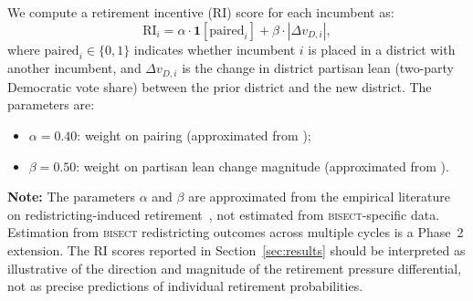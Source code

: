 We compute a retirement incentive (RI) score for each incumbent as:
\[
  \text{RI}_i = \alpha \cdot \mathbf{1}[\text{paired}_i] + \beta \cdot |\Delta v_{D,i}|,
\]
where $\text{paired}_i \in \{0,1\}$ indicates whether incumbent $i$ is placed in a
district with another incumbent, and $\Delta v_{D,i}$ is the change in district
partisan lean (two-party Democratic vote share) between the prior district and the
new district. The parameters are:
\begin{itemize}
  \item $\alpha = 0.40$: weight on pairing (approximated from \citet{ansolabehere2000incumbency});
  \item $\beta = 0.50$: weight on partisan lean change magnitude (approximated from
    \citet{ansolabehere2000incumbency}).
\end{itemize}
\textbf{Note:} The parameters $\alpha$ and $\beta$ are approximated from the empirical
literature on redistricting-induced retirement~\citep{ansolabehere2000incumbency},
not estimated from \textsc{bisect}-specific data. Estimation from \textsc{bisect}
redistricting outcomes across multiple cycles is a Phase~2 extension. The RI scores
reported in Section~\ref{sec:results} should be interpreted as illustrative of the
direction and magnitude of the retirement pressure differential, not as precise
predictions of individual retirement probabilities.
